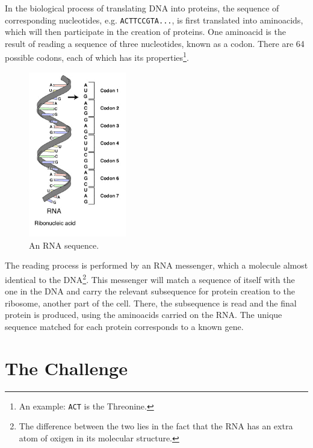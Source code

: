 \documentclass[a4paper, 11pt]{article} %
\begin{document}
In the biological process of translating DNA into proteins, the sequence of corresponding nucleotides, e.g. \texttt{ACTTCCGTA...}, is first translated into aminoacids, which will then participate in the creation of proteins. One aminoacid is the result of reading a sequence of three nucleotides, known as a codon. There are 64 possible codons, each of which has its properties\footnote{An example: \texttt{ACT} is the Threonine.}.

\begin{figure} %
\begin{center}
\includegraphics[width=0.38\textwidth]{rna_codons.png}
\end{center}
\caption{An RNA sequence.}
\end{figure}

The reading process is performed by an RNA messenger, which a molecule almost identical to the DNA\footnote{The difference between the two lies in the fact that the RNA has an extra atom of oxigen in its molecular structure.}. This messenger will match a sequence of itself with the one in the DNA and carry the relevant subsequence for protein creation to the ribosome, another part of the cell. There, the subsequence is read and the final protein is produced, using the aminoacids carried on the RNA. The unique sequence matched for each protein corresponds to a known gene.


\section*{The Challenge}
\end{document}
